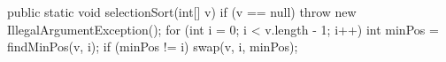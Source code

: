 \begin{unipdcode}[language=Java]
public static void selectionSort(int[] v) {
    if (v == null) throw new IllegalArgumentException();
    for (int i = 0; i < v.length - 1; i++) {
        int minPos = findMinPos(v, i);
        if (minPos != i) swap(v, i, minPos);
    }
}
\end{unipdcode}
